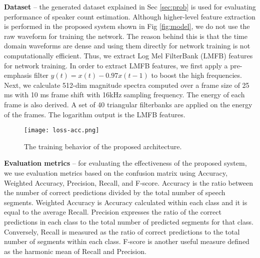 \documentclass[a4paper]{article}
\begin{document}
\textbf{Dataset} -- the generated dataset explained in Sec \ref{sec:prob} is used for evaluating performance of speaker count estimation. Although higher-level feature extraction is performed in the proposed system shown in Fig \ref{fig:model}, we do not use the raw waveform for training the network. The reason behind this is that the time domain waveforms are dense and using them directly for network training is not computationally efficient. Thus, we extract Log Mel FilterBank (LMFB) features for network training. In order to extract LMFB features, we first apply a pre-emphasis filter $y(t) = x(t) - 0.97x(t-1) $ to boost the high frequencies. Next, we calculate 512-dim magnitude spectra computed over a frame size of 25 ms with 10 ms frame shift with 16kHz sampling frequency. The energy of each frame is also derived. A set of 40 triangular filterbanks are applied on the energy of the frames. The logarithm output is the LMFB features. 

\begin{figure}
\centering
\texttt{[image: loss-acc.png]}
\vspace{-0.4cm}
\caption{The training behavior of the proposed architecture. }
\vspace{-0.4cm}
\label{fig:loss}
\end{figure}



\textbf{Evaluation metrics} -- for evaluating the effectiveness of the proposed system, we use evaluation metrics based on the confusion matrix using Accuracy, Weighted Accuracy,  Precision,  Recall,  and F-score. Accuracy is the ratio between the number of correct predictions divided by the total number of speech segments. Weighted Accuracy is Accuracy calculated within each class and it is equal to the average Recall. Precision expresses the ratio of the correct predictions in each class to the total number of predicted segments for that class. Conversely, Recall is measured as the ratio of correct predictions to the total number of segments within each class. F-score is another useful measure defined as the harmonic mean of Recall and Precision.
\end{document}
